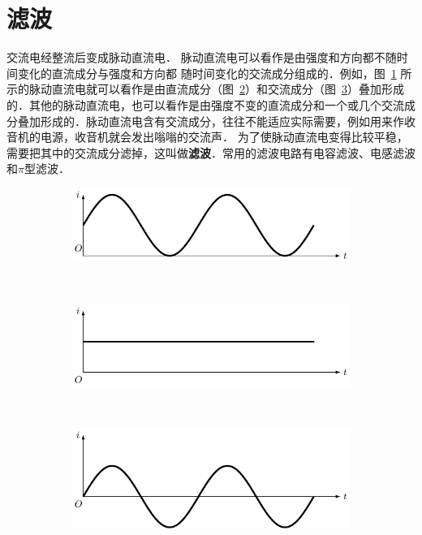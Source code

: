 \section{滤波}
交流电经整流后变成脉动直流电．
脉动直流电可以看作是由强度和方向都不随时间变化的直流成分与强度和方向都
随时间变化的交流成分组成的．例如，图~\ref{fig_C_3-36a} 所示的脉动直流电就可以看作是由直流成分（图~\ref{fig_C_3-36b}）和交流成分（图~\ref{fig_C_3-36c}）叠加形成的．其他的脉动直流电，也可以看作是由强度不变的直流成分和一个或几个交流成分叠加形成的．脉动直流电含有交流成分，往往不能适应实际需要，例如用来作收音机的电源，收音机就会发出嗡嗡的交流声．
为了使脉动直流电变得比较平稳，需要把其中的交流成分滤掉，这叫做\textbf{滤波}．常用的滤波电路有电容滤波、电感滤波和$\pi$型滤波．
\begin{figure}[htbp]
    \centering
    \begin{subfigure}{0.8\linewidth}
        \centering
        \includegraphics{fig/C/3-36a.pdf}
        \caption{}\label{fig_C_3-36a}
    \end{subfigure}
    \\
    \begin{subfigure}{0.8\linewidth}
        \centering
        \includegraphics{fig/C/3-36b.pdf}
        \caption{}\label{fig_C_3-36b}
    \end{subfigure}
    \\
    \begin{subfigure}{0.8\linewidth}
        \centering
        \includegraphics{fig/C/3-36c.pdf}
        \caption{}\label{fig_C_3-36c}
    \end{subfigure}
    \caption{}\label{fig_C_3-36}
\end{figure}

